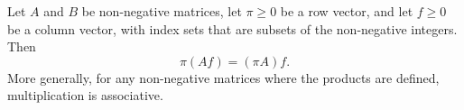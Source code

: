 Let $A$ and $B$ be non-negative matrices, let $\pi \geq 0$ be a row vector, and let $f \geq 0$ be a column vector, with index sets that are subsets of the non-negative integers. Then
$$\pi(Af) = (\pi A)f.$$
More generally, for any non-negative matrices where the products are defined, multiplication is associative.

